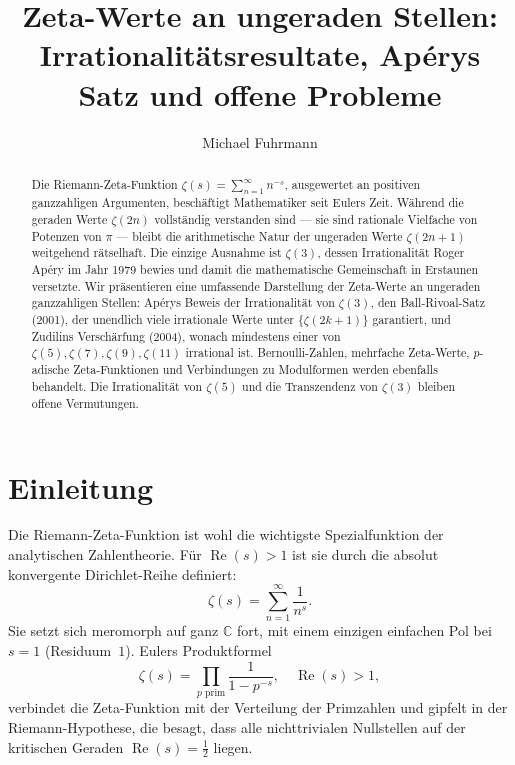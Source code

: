 \documentclass[12pt,a4paper]{amsart}
\author{Michael Fuhrmann}
\theoremstyle{definition}
\theoremstyle{remark}
\begin{document}
\title{Zeta-Werte an ungeraden Stellen:\\
Irrationalitätsresultate, Apérys Satz und offene Probleme}

\begin{abstract}
Die Riemann-Zeta-Funktion $\zeta(s) = \sum_{n=1}^{\infty} n^{-s}$, ausgewertet
an positiven ganzzahligen Argumenten, beschäftigt Mathematiker seit Eulers Zeit.
Während die geraden Werte $\zeta(2n)$ vollständig verstanden sind --- sie sind
rationale Vielfache von Potenzen von $\pi$ --- bleibt die arithmetische Natur der
ungeraden Werte $\zeta(2n+1)$ weitgehend rätselhaft. Die einzige Ausnahme ist
$\zeta(3)$, dessen Irrationalität Roger Apéry im Jahr 1979 bewies und damit die
mathematische Gemeinschaft in Erstaunen versetzte. Wir präsentieren eine umfassende
Darstellung der Zeta-Werte an ungeraden ganzzahligen Stellen: Apérys Beweis der
Irrationalität von $\zeta(3)$, den Ball-Rivoal-Satz (2001), der unendlich viele
irrationale Werte unter $\{\zeta(2k+1)\}$ garantiert, und Zudilins Verschärfung
(2004), wonach mindestens einer von $\zeta(5), \zeta(7), \zeta(9), \zeta(11)$
irrational ist. Bernoulli-Zahlen, mehrfache Zeta-Werte, $p$-adische
Zeta-Funktionen und Verbindungen zu Modulformen werden ebenfalls behandelt.
Die Irrationalität von $\zeta(5)$ und die Transzendenz von $\zeta(3)$ bleiben
offene Vermutungen.
\end{abstract}

\maketitle

\tableofcontents

\section{Einleitung}

Die Riemann-Zeta-Funktion ist wohl die wichtigste Spezialfunktion der analytischen
Zahlentheorie. Für $\operatorname{Re}(s) > 1$ ist sie durch die absolut konvergente
Dirichlet-Reihe definiert:
\[
  \zeta(s) = \sum_{n=1}^{\infty} \frac{1}{n^s}.
\]
Sie setzt sich meromorph auf ganz $\mathbb{C}$ fort, mit einem einzigen einfachen
Pol bei $s = 1$ (Residuum~$1$). Eulers Produktformel
\[
  \zeta(s) = \prod_{p \text{ prim}} \frac{1}{1 - p^{-s}}, \quad
  \operatorname{Re}(s) > 1,
\]
verbindet die Zeta-Funktion mit der Verteilung der Primzahlen und gipfelt in der
Riemann-Hypothese, die besagt, dass alle nichttrivialen Nullstellen auf der
kritischen Geraden $\operatorname{Re}(s) = \tfrac{1}{2}$ liegen.
\end{document}

